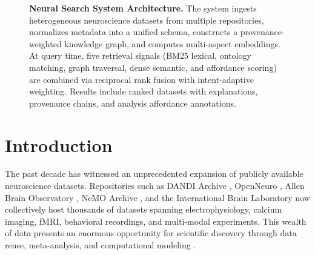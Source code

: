 \documentclass{article}
\theoremstyle{definition}
\begin{document}
\begin{figure}[t]
\caption{\textbf{Neural Search System Architecture.} The system ingests heterogeneous neuroscience datasets from multiple repositories, normalizes metadata into a unified schema, constructs a provenance-weighted knowledge graph, and computes multi-aspect embeddings. At query time, five retrieval signals (BM25 lexical, ontology matching, graph traversal, dense semantic, and affordance scoring) are combined via reciprocal rank fusion with intent-adaptive weighting. Results include ranked datasets with explanations, provenance chains, and analysis affordance annotations.}
\label{fig:system-architecture}
\end{figure}

\section{Introduction}
\label{sec:introduction}

The past decade has witnessed an unprecedented expansion of publicly available neuroscience datasets. Repositories such as DANDI Archive \citep{rubinen2024dandi}, OpenNeuro \citep{markiewicz2021openneuro}, Allen Brain Observatory \citep{allen2019brain}, NeMO Archive \citep{nemo2023archive}, and the International Brain Laboratory \citep{ibl2021standardized} now collectively host thousands of datasets spanning electrophysiology, calcium imaging, fMRI, behavioral recordings, and multi-modal experiments. This wealth of data presents an enormous opportunity for scientific discovery through data reuse, meta-analysis, and computational modeling \citep{poldrack2014making, yarkoni2019large}.
\end{document}

